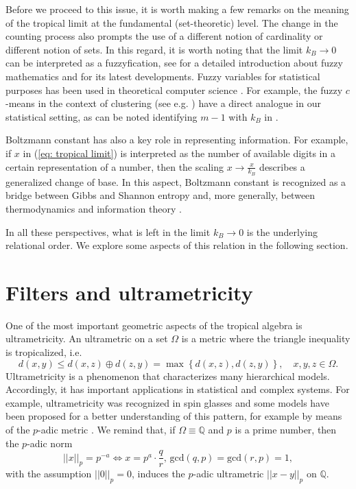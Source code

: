 \documentclass[11pt,british,reqno]{article}
\numberwithin{equation}{section}
\numberwithin{figure}{section}
\numberwithin{table}{section}
\theoremstyle{definition}
\theoremstyle{definition}
\theoremstyle{plain}
\theoremstyle{plain}
\theoremstyle{remark}
\theoremstyle{plain}
\numberwithin{equation}{section}
\numberwithin{figure}{section}
\numberwithin{table}{section}
\theoremstyle{plain}
\begin{document}
Before we proceed to this issue, it is worth making a few remarks on the meaning of the tropical limit at the fundamental (set-theoretic) level. The change in the counting process also prompts the use of a different notion of cardinality or different notion of sets.
In this regard, it is worth noting that the limit $k_{B}\rightarrow0$
can be interpreted as a fuzzyfication, see \cite{Zadeh1965,Klir1988}
for a detailed introduction about fuzzy mathematics and \cite{Kahraman2016}
for its latest developments. Fuzzy variables for statistical purposes
has been used in theoretical computer science \cite{Yasuda2012}.
For example, the fuzzy $c$-means in the context of clustering (see
e.g. \cite{Miyamoto1997}) have a direct analogue in our statistical
setting, as can be noted identifying $m-1$ with $k_{B}$ in \cite{Miyamoto1997}. 

Boltzmann constant has also a key role in representing information.
For example, if $x$ in (\ref{eq: tropical limit}) is interpreted
as the number of available digits in a certain representation of a
number, then the scaling ${\displaystyle x\rightarrow\frac{x}{k_{B}}}$
describes a generalized change of base. In this aspect, Boltzmann
constant is recognized as a bridge between Gibbs and Shannon entropy
and, more generally, between thermodynamics and information theory
\cite{Landauer1961}. 

In all these perspectives, what is left in the limit $k_{B}\rightarrow0$
is the underlying relational order. We explore some aspects of this relation in the following section. 


\section{\label{sec: Filters and ultrametricity} Filters and ultrametricity}

One of the most important geometric aspects of the tropical algebra
is ultrametricity. An ultrametric on a set $\Omega$ is a metric where
the triangle inequality is tropicalized, i.e. 
\begin{equation}
d(x,y)\leq d(x,z)\oplus d(z,y)=\max\left\{ d(x,z),d(z,y)\right\} ,\quad x,y,z\in\Omega.\label{eq: ultrametric, a}
\end{equation}
Ultrametricity is a phenomenon that characterizes many hierarchical
models. Accordingly, it has important applications in statistical
and complex systems. For example, ultrametricity was recognized in
spin glasses \cite{RTV1986} and some models have been proposed for
a better understanding of this pattern, for example by means of the $p$-adic metric
\cite{Koblitz1977,Khrennikov1994,Grossman1989}. We remind that, if $\Omega\equiv\mathbb{Q}$ and $p$ is a prime number, then the $p$-adic norm 
\begin{equation}
||x||_{p}=p^{-a}\Leftrightarrow x=p^{a}\cdot\frac{q}{r},\,\mathrm{gcd}(q,p)=\mathrm{gcd}(r,p)=1,\label{eq: p-adic norm}
\end{equation}
with the assumption $||0||_{p}=0$, induces the $p$-adic ultrametric
$||x-y||_{p}$ on $\mathbb{Q}$. 
\end{document}
